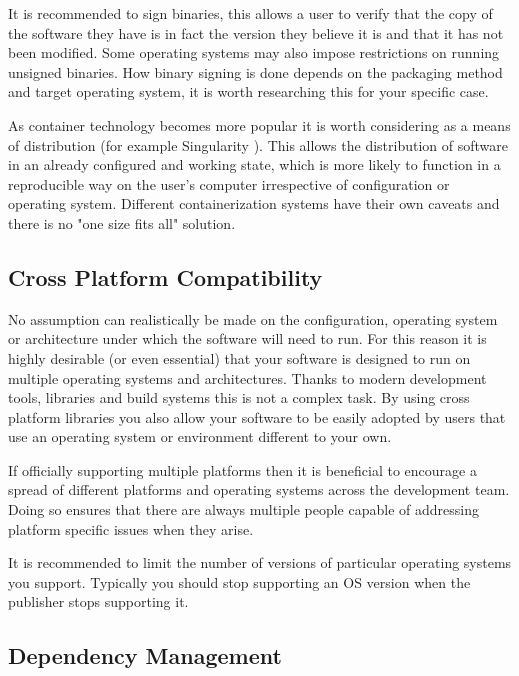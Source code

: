 \documentclass[jnr]{iosart2x}
\begin{document}
It is recommended to sign binaries, this allows a user to verify that the copy of the software they have is in fact the version they believe it is and that it has not been modified.
Some operating systems may also impose restrictions on running unsigned binaries.
How binary signing is done depends on the packaging method and target operating system, it is worth researching this for your specific case.

As container technology becomes more popular it is worth considering as a means of distribution (for example Singularity \cite{Kurtzer_2017}).
This allows the distribution of software in an already configured and working state, which is more likely to function in a reproducible way on the user's computer irrespective of configuration or operating system.
Different containerization systems have their own caveats and there is no "one size fits all" solution.

\subsection{Cross Platform Compatibility}
\label{Cross platform}

No assumption can realistically be made on the configuration, operating system or architecture under which the software will need to run.
For this reason it is highly desirable (or even essential) that your software is designed to run on multiple operating systems and architectures.
Thanks to modern development tools, libraries and build systems this is not a complex task.
By using cross platform libraries you also allow your software to be easily adopted by users that use an operating system or environment different to your own.

If officially supporting multiple platforms then it is beneficial to encourage a spread of different platforms and operating systems across the development team.
Doing so ensures that there are always multiple people capable of addressing platform specific issues when they arise.

It is recommended to limit the number of versions of particular operating systems you support.
Typically you should stop supporting an OS version when the publisher stops supporting it.

\subsection{Dependency Management}
\label{Dependency Management}
\end{document}
